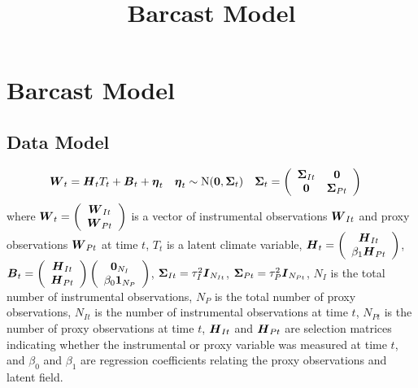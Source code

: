 \documentclass{article}\usepackage[]{graphicx}\usepackage[]{color}
\title{Barcast Model}
\def\bm#1{\mbox{\boldmath $#1$}}
\begin{document}
\maketitle
%
%
\section{Barcast Model}
%
%
\subsection{Data Model}
%
\begin{align*}
%
\bm{W}_t & = \bm{H}_t T_t + \bm{B}_t + \bm{\eta}_t & \bm{\eta}_t & \sim \mbox{N}(\bm{0}, \bm{\Sigma}_t) & \bm{\Sigma}_t & = \left( \begin{array}{cc} \bm{\Sigma}_{It} & \bm{0}\\ \bm{0} & \bm{\Sigma}_{Pt} \end{array} \right)
%
\end{align*}
%
where $\bm{W}_t = \left( \begin{array}{c} \bm{W}_{It} \\ \bm{W}_{Pt} \end{array} \right)$ is a vector of instrumental observations $\bm{W}_{It}$ and proxy observations $\bm{W}_{Pt}$ at time $t$, $T_t$ is a latent climate variable, $\bm{H}_t = \left( \begin{array}{c} \bm{H}_{It}\\ \beta_1 \bm{H}_{Pt} \end{array} \right)$, $\bm{B}_t = \left( \begin{array}{c} \bm{H}_{It}\\ \bm{H}_{Pt} \end{array} \right) \left( \begin{array}{c} \bm{0}_{N_I}\\ \beta_0 \bm{1}_{N_P} \end{array} \right)$, $\bm{\Sigma}_{It} = \tau_I^2 \bm{I}_{N_{It}}$, $\bm{\Sigma}_{Pt} = \tau_P^2 \bm{I}_{N_{Pt}}$, $N_I$ is the total number of instrumental observations, $N_P$ is the total number of proxy observations, $N_{It}$ is the number of instrumental observations at time $t$, $N_{Pt}$ is the number of proxy observations at time $t$, $\bm{H}_{It}$ and $\bm{H}_{Pt}$ are selection matrices indicating whether the instrumental or proxy variable was measured at time $t$, and $\beta_0$ and $\beta_1$ are regression coefficients relating the proxy observations and latent field. 
%
%
\end{document}
